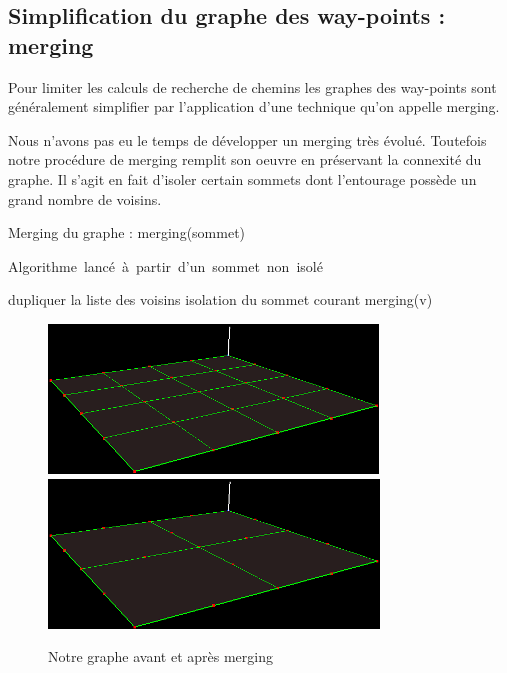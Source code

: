 \documentclass[a4paper,12pt]{report}
\begin{document}
\subsection{Simplification du graphe des way-points : merging}

Pour limiter les calculs de recherche de chemins les graphes des way-points sont généralement simplifier par l'application d'une technique qu'on appelle merging. 

Nous n'avons pas eu le temps de développer un merging très évolué. Toutefois notre procédure de merging remplit son oeuvre en préservant la connexité du graphe. Il s'agit en fait d'isoler certain sommets dont l'entourage possède un grand nombre de voisins. 

\begin{algorithm}[h]
\caption{Merging du graphe : merging(sommet)}
\label{merging_graphe}
\mbox{Algorithme lancé à partir d'un sommet non isolé}
\begin{algorithmic}[1]
  \STATE dupliquer la liste des voisins
      \STATE isolation du sommet courant
    \ENDIF
  \ENDIF
    \STATE merging(v)
  \ENDFOR
\ENDIF
\end{algorithmic}
\end{algorithm}

\begin{figure}[h]
\centering
\includegraphics[scale=0.6]{Images/maillage.png}
\includegraphics[scale=0.6]{Images/merging.png}
\caption{Notre graphe avant et après merging}
\end{figure}
\vspace{0.5cm}
\end{document}
